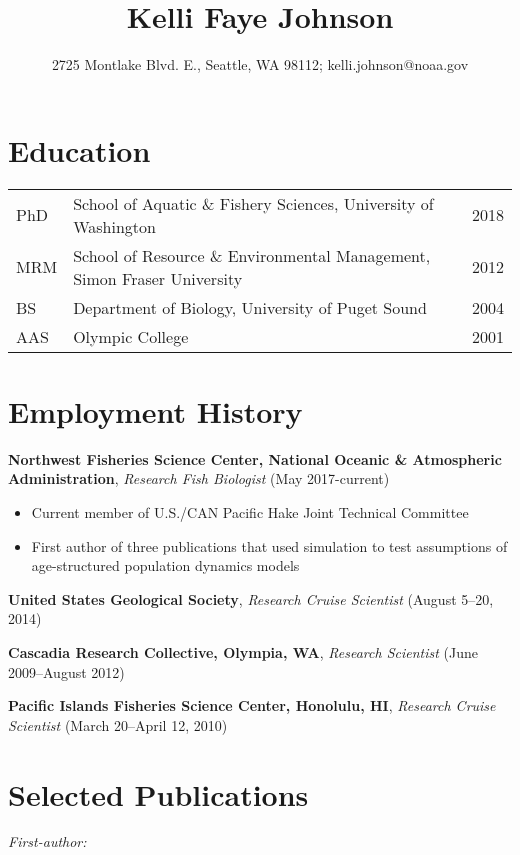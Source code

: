 \documentclass[10pt]{article}
\title{\bfseries\Large Kelli Faye Johnson}
\author{2725 Montlake Blvd. E., Seattle, WA 98112; kelli.johnson@noaa.gov}
\date{}
\begin{document}

\maketitle
\vspace{-15mm}
\noindent\makebox[\linewidth]{\rule{\paperwidth}{0.4pt}}

\section*{Education}
\begin{tabular}{lll}
PhD & School of Aquatic \& Fishery Sciences, University of Washington & 2018 \\
MRM & School of Resource \& Environmental Management, Simon Fraser University & 2012 \\
BS & Department of Biology, University of Puget Sound & 2004 \\
AAS & Olympic College & 2001 \\
\end{tabular}

\section*{Employment History}

\textbf{Northwest Fisheries Science Center, National Oceanic \& Atmospheric Administration}, \textit{Research Fish Biologist} (May 2017-current)
\begin{itemize}
\vspace{-2.5mm}
  \item Current member of U.S./CAN Pacific Hake Joint Technical Committee
  \item First author of three publications that used simulation to test assumptions of age-structured population dynamics models
\end{itemize}

\noindent \textbf{United States Geological Society}, \textit{Research Cruise Scientist} (August 5--20, 2014)

\noindent \textbf{Cascadia Research Collective, Olympia, WA}, \textit{Research Scientist} (June 2009--August 2012)

\noindent \textbf{Pacific Islands Fisheries Science Center, Honolulu, HI}, \textit{Research Cruise Scientist} (March 20--April 12, 2010)

\section*{Selected Publications}
\noindent \textit{First-author:}
\end{document}

